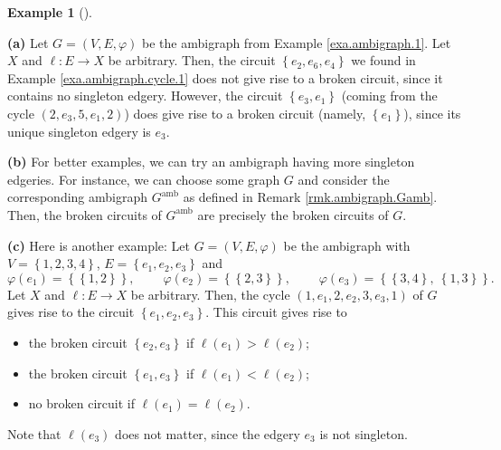 \documentclass[numbers=enddot,12pt,final,onecolumn,notitlepage]{scrartcl}%
\theoremstyle{definition}
\newtheorem{exmp}[theo]{Example}
\newenvironment{example}[1][]
{\begin{exmp}[#1]\begin{leftbar}}
{\end{leftbar}\end{exmp}}
\begin{document}
\begin{example}
\textbf{(a)} Let $G=\left(  V,E,\varphi\right)  $ be the ambigraph from
Example \ref{exa.ambigraph.1}. Let $X$ and $\ell:E\rightarrow X$ be arbitrary.
Then, the circuit $\left\{  e_{2},e_{6},e_{4}\right\}  $ we found in Example
\ref{exa.ambigraph.cycle.1} does not give rise to a broken circuit, since it
contains no singleton edgery. However, the circuit $\left\{  e_{3}%
,e_{1}\right\}  $ (coming from the cycle $\left(  2,e_{3},5,e_{1},2\right)  $)
does give rise to a broken circuit (namely, $\left\{  e_{1}\right\}  $), since
its unique singleton edgery is $e_{3}$.

\textbf{(b)} For better examples, we can try an ambigraph having more
singleton edgeries. For instance, we can choose some graph $G$ and consider
the corresponding ambigraph $G^{\operatorname*{amb}}$ as defined in Remark
\ref{rmk.ambigraph.Gamb}. Then, the broken circuits of $G^{\operatorname*{amb}%
}$ are precisely the broken circuits of $G$.

\textbf{(c)} Here is another example: Let $G=\left(  V,E,\varphi\right)  $ be
the ambigraph with $V=\left\{  1,2,3,4\right\}  $, $E=\left\{  e_{1}%
,e_{2},e_{3}\right\}  $ and%
\[
\varphi\left(  e_{1}\right)  =\left\{  \left\{  1,2\right\}  \right\}
,\ \ \ \ \ \ \ \ \ \ \varphi\left(  e_{2}\right)  =\left\{  \left\{
2,3\right\}  \right\}  ,\ \ \ \ \ \ \ \ \ \ \varphi\left(  e_{3}\right)
=\left\{  \left\{  3,4\right\}  ,\ \left\{  1,3\right\}  \right\}  .
\]
Let $X$ and $\ell:E\rightarrow X$ be arbitrary. Then, the cycle $\left(
1,e_{1},2,e_{2},3,e_{3},1\right)  $ of $G$ gives rise to the circuit $\left\{
e_{1},e_{2},e_{3}\right\}  $. This circuit gives rise to

\begin{itemize}
\item the broken circuit $\left\{  e_{2},e_{3}\right\}  $ if $\ell\left(
e_{1}\right)  >\ell\left(  e_{2}\right)  $;

\item the broken circuit $\left\{  e_{1},e_{3}\right\}  $ if $\ell\left(
e_{1}\right)  <\ell\left(  e_{2}\right)  $;

\item no broken circuit if $\ell\left(  e_{1}\right)  =\ell\left(
e_{2}\right)  $.
\end{itemize}

\noindent Note that $\ell\left(  e_{3}\right)  $ does not matter, since the
edgery $e_{3}$ is not singleton.
\end{example}
\end{document}
